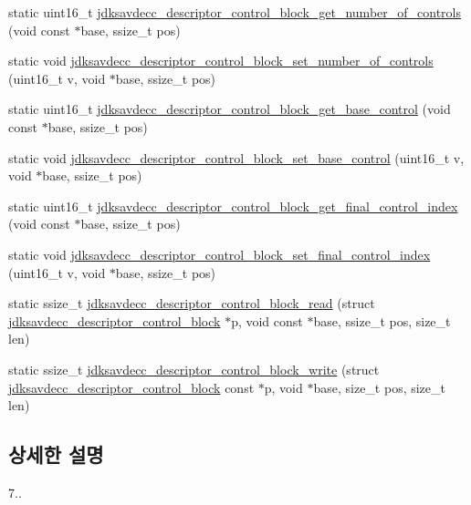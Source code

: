 \begin{DoxyCompactItemize}
static uint16\+\_\+t \hyperlink{group__descriptor__control__block_ga13a5b79837792669beafeb159f90bd35}{jdksavdecc\+\_\+descriptor\+\_\+control\+\_\+block\+\_\+get\+\_\+number\+\_\+of\+\_\+controls} (void const $\ast$base, ssize\+\_\+t pos)
\item 
static void \hyperlink{group__descriptor__control__block_ga711539be574408e567d2c1a8e4eb8c68}{jdksavdecc\+\_\+descriptor\+\_\+control\+\_\+block\+\_\+set\+\_\+number\+\_\+of\+\_\+controls} (uint16\+\_\+t v, void $\ast$base, ssize\+\_\+t pos)
\item 
static uint16\+\_\+t \hyperlink{group__descriptor__control__block_ga23503e36956db5a06a001820db961730}{jdksavdecc\+\_\+descriptor\+\_\+control\+\_\+block\+\_\+get\+\_\+base\+\_\+control} (void const $\ast$base, ssize\+\_\+t pos)
\item 
static void \hyperlink{group__descriptor__control__block_gaf35ea9253fe8d648f8ffc888af5cacfb}{jdksavdecc\+\_\+descriptor\+\_\+control\+\_\+block\+\_\+set\+\_\+base\+\_\+control} (uint16\+\_\+t v, void $\ast$base, ssize\+\_\+t pos)
\item 
static uint16\+\_\+t \hyperlink{group__descriptor__control__block_ga316f0911236c7d313a1055e6f3e5c297}{jdksavdecc\+\_\+descriptor\+\_\+control\+\_\+block\+\_\+get\+\_\+final\+\_\+control\+\_\+index} (void const $\ast$base, ssize\+\_\+t pos)
\item 
static void \hyperlink{group__descriptor__control__block_ga53eb39132c43c4d04a4a4a991ae67448}{jdksavdecc\+\_\+descriptor\+\_\+control\+\_\+block\+\_\+set\+\_\+final\+\_\+control\+\_\+index} (uint16\+\_\+t v, void $\ast$base, ssize\+\_\+t pos)
\item 
static ssize\+\_\+t \hyperlink{group__descriptor__control__block_ga6e6851ac2bbbd94b7a23e9a791f125f1}{jdksavdecc\+\_\+descriptor\+\_\+control\+\_\+block\+\_\+read} (struct \hyperlink{structjdksavdecc__descriptor__control__block}{jdksavdecc\+\_\+descriptor\+\_\+control\+\_\+block} $\ast$p, void const $\ast$base, ssize\+\_\+t pos, size\+\_\+t len)
\item 
static ssize\+\_\+t \hyperlink{group__descriptor__control__block_ga905ece8f424fe220cc58d70b32814937}{jdksavdecc\+\_\+descriptor\+\_\+control\+\_\+block\+\_\+write} (struct \hyperlink{structjdksavdecc__descriptor__control__block}{jdksavdecc\+\_\+descriptor\+\_\+control\+\_\+block} const $\ast$p, void $\ast$base, size\+\_\+t pos, size\+\_\+t len)
\end{DoxyCompactItemize}


\subsection{상세한 설명}
7.. 

